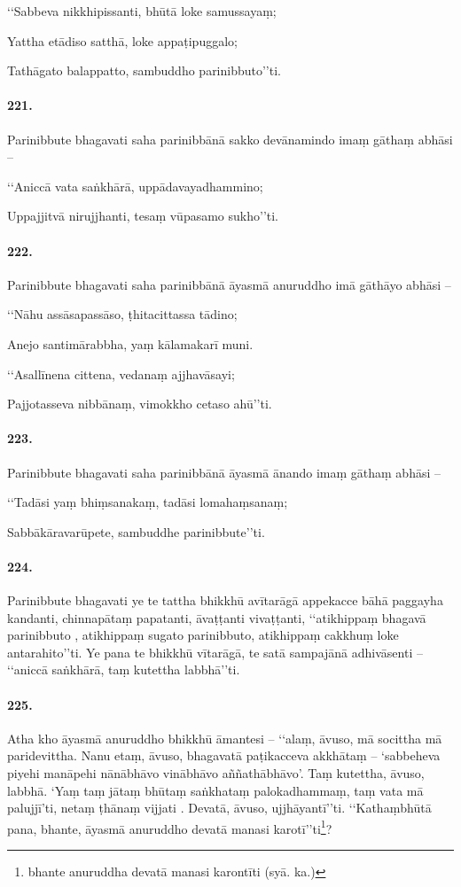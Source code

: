 ‘‘Sabbeva nikkhipissanti, bhūtā loke samussayaṃ;

Yattha etādiso satthā, loke appaṭipuggalo;

Tathāgato balappatto, sambuddho parinibbuto’’ti.

\paragraph{221.} Parinibbute bhagavati saha parinibbānā sakko devānamindo imaṃ gāthaṃ abhāsi –

‘‘Aniccā vata saṅkhārā, uppādavayadhammino;

Uppajjitvā nirujjhanti, tesaṃ vūpasamo sukho’’ti.

\paragraph{222.} Parinibbute bhagavati saha parinibbānā āyasmā anuruddho imā gāthāyo abhāsi –

‘‘Nāhu assāsapassāso, ṭhitacittassa tādino;

Anejo santimārabbha, yaṃ kālamakarī muni.

‘‘Asallīnena cittena, vedanaṃ ajjhavāsayi;

Pajjotasseva nibbānaṃ, vimokkho cetaso ahū’’ti.

\paragraph{223.} Parinibbute bhagavati saha parinibbānā āyasmā ānando imaṃ gāthaṃ abhāsi –

‘‘Tadāsi yaṃ bhiṃsanakaṃ, tadāsi lomahaṃsanaṃ;

Sabbākāravarūpete, sambuddhe parinibbute’’ti.

\paragraph{224.} Parinibbute bhagavati ye te tattha bhikkhū avītarāgā appekacce bāhā paggayha kandanti, chinnapātaṃ papatanti, āvaṭṭanti vivaṭṭanti, ‘‘atikhippaṃ bhagavā parinibbuto , atikhippaṃ sugato parinibbuto, atikhippaṃ cakkhuṃ loke antarahito’’ti. Ye pana te bhikkhū vītarāgā, te satā sampajānā adhivāsenti – ‘‘aniccā saṅkhārā, taṃ kutettha labbhā’’ti.

\paragraph{225.} Atha kho āyasmā anuruddho bhikkhū āmantesi – ‘‘alaṃ, āvuso, mā socittha mā paridevittha. Nanu etaṃ, āvuso, bhagavatā paṭikacceva akkhātaṃ – ‘sabbeheva piyehi manāpehi nānābhāvo vinābhāvo aññathābhāvo’. Taṃ kutettha, āvuso, labbhā. ‘Yaṃ taṃ jātaṃ bhūtaṃ saṅkhataṃ palokadhammaṃ, taṃ vata mā palujjī’ti, netaṃ ṭhānaṃ vijjati . Devatā, āvuso, ujjhāyantī’’ti. ‘‘Kathaṃbhūtā pana, bhante, āyasmā anuruddho devatā manasi karotī’’ti\footnote{bhante anuruddha devatā manasi karontīti (syā. ka.)}?

